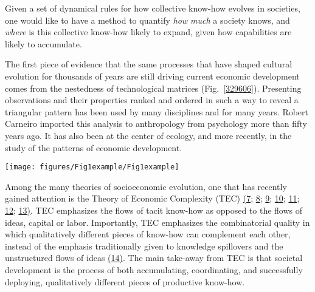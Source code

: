\documentclass{pnastwo}
\begin{document}
\begin{article}
Given a set of dynamical rules for how collective know-how evolves in societies, one would like to have a method to quantify \emph{how much} a society knows, and \emph{where} is this collective know-how likely to expand, given how capabilities are likely to accumulate.

The first piece of evidence that the same processes that have shaped cultural evolution for thousands of years are still driving current economic development comes from the nestedness of technological matrices (Fig.~\ref{329606}). Presenting observations and their properties ranked and ordered in such a way to reveal a triangular pattern has been used by many disciplines and for many years. Robert Carneiro imported this analysis to anthropology from psychology more than fifty years ago. It has also been at the center of ecology, and more recently, in the study of the patterns of economic development.
\begin{figure*}[h]
\begin{center}
\texttt{[image: figures/Fig1example/Fig1example]}
\caption{{{[}I THINK WE SHOULD START WITH A FIGURE SHOWING THE PATTERN OF
NESTEDNESS (OR LACK THEREOF) IN DIFFERENT TYPES OF ASSOCIATIONS,
DIFFERENT CONTEXTS, DIFFERENT SCALES, AND DIFFERENT TIMES{]}
{\label{329606}}%
}}
\end{center}
\end{figure*}

Among the many theories of socioeconomic evolution, one that has recently gained attention is the Theory of Economic Complexity (TEC) \hyperref[csl:7]{(7}; \hyperref[csl:8]{8}; \hyperref[csl:9]{9}; \hyperref[csl:10]{10}; \hyperref[csl:11]{11}; \hyperref[csl:12]{12}; \hyperref[csl:13]{13)}. TEC emphasizes the flows of tacit know-how as opposed to the flows of ideas, capital or labor. Importantly, TEC emphasizes the combinatorial quality in which qualitatively different pieces of know-how can complement each other, instead of the emphasis traditionally given to knowledge spillovers and the unstructured flows of ideas \hyperref[csl:14]{(14)}. The main take-away from TEC is that societal development is the process of both accumulating, coordinating, and successfully deploying, qualitatively different pieces of productive know-how.



\end{article}
\end{document}
